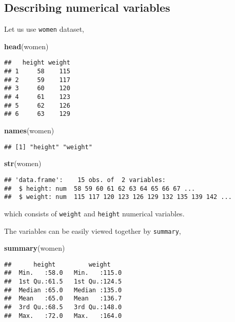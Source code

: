 \documentclass[]{book}
\newenvironment{Shaded}{\begin{snugshade}}{\end{snugshade}}
\newcommand{\KeywordTok}[1]{\textcolor[rgb]{0.13,0.29,0.53}{\textbf{{#1}}}}
\newcommand{\NormalTok}[1]{{#1}}
\theoremstyle{definition}
\theoremstyle{definition}
\theoremstyle{remark}
\begin{document}
\subsection{Describing numerical
variables}\label{describing-numerical-variables}

Let us use \texttt{women} dataset,

\begin{Shaded}
\begin{Highlighting}[]
\KeywordTok{head}\NormalTok{(women)}
\end{Highlighting}
\end{Shaded}

\begin{verbatim}
##   height weight
## 1     58    115
## 2     59    117
## 3     60    120
## 4     61    123
## 5     62    126
## 6     63    129
\end{verbatim}

\begin{Shaded}
\begin{Highlighting}[]
\KeywordTok{names}\NormalTok{(women)}
\end{Highlighting}
\end{Shaded}

\begin{verbatim}
## [1] "height" "weight"
\end{verbatim}

\begin{Shaded}
\begin{Highlighting}[]
\KeywordTok{str}\NormalTok{(women)}
\end{Highlighting}
\end{Shaded}

\begin{verbatim}
## 'data.frame':    15 obs. of  2 variables:
##  $ height: num  58 59 60 61 62 63 64 65 66 67 ...
##  $ weight: num  115 117 120 123 126 129 132 135 139 142 ...
\end{verbatim}

which consists of \texttt{weight} and \texttt{height} numerical
variables.

The variables can be easily viewed together by \texttt{summary},

\begin{Shaded}
\begin{Highlighting}[]
\KeywordTok{summary}\NormalTok{(women)}
\end{Highlighting}
\end{Shaded}

\begin{verbatim}
##      height         weight     
##  Min.   :58.0   Min.   :115.0  
##  1st Qu.:61.5   1st Qu.:124.5  
##  Median :65.0   Median :135.0  
##  Mean   :65.0   Mean   :136.7  
##  3rd Qu.:68.5   3rd Qu.:148.0  
##  Max.   :72.0   Max.   :164.0
\end{verbatim}
\end{document}
